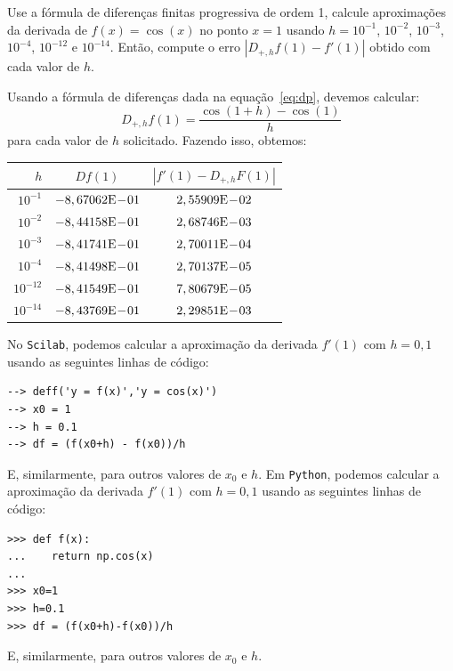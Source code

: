 \begin{ex}\label{ex:dp}
Use a fórmula de diferenças finitas progressiva de ordem 1, calcule aproximações da derivada de $f(x)=\cos(x)$ no ponto $x=1$ usando $h=10^{-1}$, $10^{-2}$, $10^{-3}$, $10^{-4}$, $10^{-12}$ e $10^{-14}$. Então, compute o erro $|D_{+,h}f(1)-f'(1)|$ obtido com cada valor de $h$.
\end{ex}
\begin{sol}
Usando a fórmula de diferenças dada na equação~\eqref{eq:dp}, devemos calcular:
\begin{equation*}
  D_{+,h}f(1) = \frac{\cos(1 + h) - \cos(1)}{h}
\end{equation*}
para cada valor de $h$ solicitado. Fazendo isso, obtemos:
\begin{center}
  \begin{tabular}{r|c|c}
    $h$ & $Df(1)$ & $|f'(1) - D_{+,h}F(1)|$ \\ \hline
    $10^{-1}$ & $-8,67062\mathrm{E}\!-\!01$ & $2,55909\mathrm{E}\!-\!02$\\
    $10^{-2}$ & $-8,44158\mathrm{E}\!-\!01$ & $2,68746\mathrm{E}\!-\!03$\\
    $10^{-3}$ & $-8,41741\mathrm{E}\!-\!01$ & $2,70011\mathrm{E}\!-\!04$\\
    $10^{-4}$ & $-8,41498\mathrm{E}\!-\!01$ & $2,70137\mathrm{E}\!-\!05$ \\
    $10^{-12}$ & $-8,41549\mathrm{E}\!-\!01$ & $7,80679\mathrm{E}\!-\!05$\\
    $10^{-14}$ & $-8,43769\mathrm{E}\!-\!01$ & $2,29851\mathrm{E}\!-\!03$ \\\hline
  \end{tabular}
\end{center}

\ifisscilab
No \verb+Scilab+, podemos calcular a aproximação da derivada $f'(1)$ com $h=0,1$ usando as seguintes linhas de código:
\begin{verbatim}
--> deff('y = f(x)','y = cos(x)')
--> x0 = 1
--> h = 0.1
--> df = (f(x0+h) - f(x0))/h
\end{verbatim}
E, similarmente, para outros valores de $x_0$ e $h$.
\fi
\ifispython
Em \verb+Python+, podemos calcular a aproximação da derivada $f'(1)$ com $h=0,1$ usando as seguintes linhas de código:
\begin{verbatim}
>>> def f(x):
...    return np.cos(x)
...
>>> x0=1
>>> h=0.1
>>> df = (f(x0+h)-f(x0))/h
\end{verbatim}
E, similarmente, para outros valores de $x_0$ e $h$.
\fi
\end{sol}

